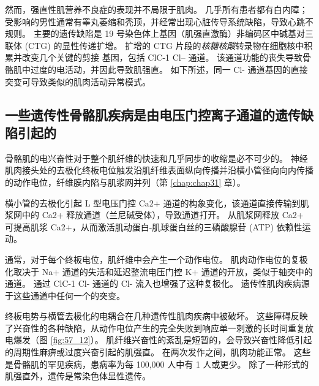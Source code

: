 然而，强直性肌营养不良症的表现并不局限于肌肉。
几乎所有患者都有白内障；
受影响的男性通常有睾丸萎缩和秃顶，并经常出现心脏传导系统缺陷，导致心跳不规则。
主要的遗传缺陷是 19 号染色体上基因（肌强直激酶）非编码区中碱基对三联体 (CTG) 的显性传递扩增。
扩增的 CTG 片段的\textit{核糖核酸}转录物在细胞核中积累并改变几个关键的剪接 基因，包括 ClC-1 Cl– 通道。
该通道功能的丧失导致骨骼肌中过度的电活动，并因此导致肌强直。
如下所述，同一 Cl- 通道基因的直接突变可导致类似的肌肉活动异常模式。



\subsection{一些遗传性骨骼肌疾病是由电压门控离子通道的遗传缺陷引起的}

骨骼肌的电兴奋性对于整个肌纤维的快速和几乎同步的收缩是必不可少的。
神经肌肉接头处的去极化终板电位触发沿肌纤维表面纵向传播并沿横小管径向向内传播的动作电位，纤维膜内陷与肌浆网并列（第 \ref{chap:chap31} 章）。


横小管的去极化引起 L 型电压门控 Ca2+ 通道的构象变化，该通道直接传输到肌浆网中的 Ca2+ 释放通道（兰尼碱受体），导致通道打开。
从肌浆网释放 Ca2+ 可提高肌浆 Ca2+，从而激活肌动蛋白-肌球蛋白丝的三磷酸腺苷 (ATP) 依赖性运动。


通常，对于每个终板电位，肌纤维中会产生一个动作电位。
肌肉动作电位的复极化取决于 Na+ 通道的失活和延迟整流电压门控 K+ 通道的开放，类似于轴突中的通道。
通过 ClC-1 Cl- 通道的 Cl- 流入也增强了这种复极化。
遗传性肌肉疾病源于这些通道中任何一个的突变。


终板电势与横管去极化的电耦合在几种遗传性肌肉疾病中被破坏。
这些障碍反映了兴奋性的各种缺陷，从动作电位产生的完全失败到响应单一刺激的长时间重复放电爆发（图 \ref{fig:57_12}）。
肌纤维兴奋性的紊乱是短暂的，会导致兴奋性降低引起的周期性麻痹或过度兴奋引起的肌强直。
在两次发作之间，肌肉功能正常。 这些是骨骼肌的罕见疾病，患病率为每 100,000 人中有 1 人或更少。
除了一种形式的肌强直外，遗传是常染色体显性遗传。


